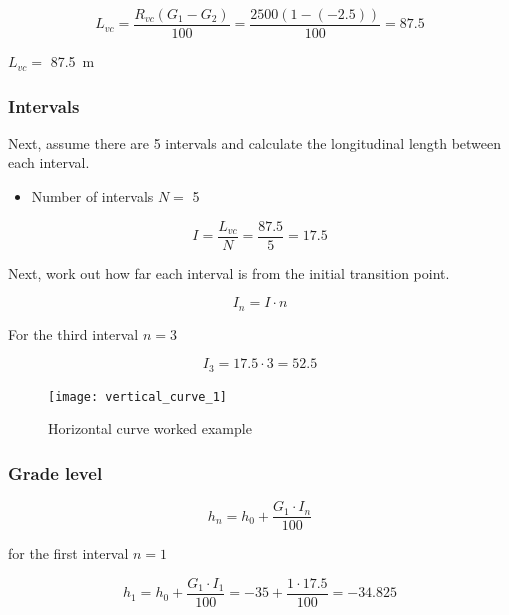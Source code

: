\documentclass{bcrre_exam}
\begin{document}
\begin{equation}
    L_{vc} = \frac{R_{vc}(G_1-G_2)}{100}=\frac{2500(1-(-2.5))}{100}=87.5
\end{equation}

$L_{vc}=$ \qty{87.5}{m}

\subsubsection*{Intervals}

Next, assume there are 5 intervals and calculate the longitudinal length between each interval.

\begin{itemize}
    \item Number of intervals $N=$ \num{5}
\end{itemize}

\begin{equation}
    I = \frac{L_{vc}}{N} = \frac{87.5}{5} = 17.5
\end{equation}

Next, work out how far each interval is from the initial transition point.

\begin{equation}
    I_n = I \cdot n
\end{equation}

For the third interval $n=3$

\begin{equation}
    I_3 = 17.5 \cdot 3 = 52.5
\end{equation}

\begin{figure}[h]
    \centering
    \texttt{[image: vertical\_curve\_1]}
    \caption{Horizontal curve worked example}
    \label{fig:hoz-cur-1}
\end{figure}

\subsubsection*{Grade level}

\begin{equation}
    h_n=h_0+\frac{G_1 \cdot I_n}{100}
\end{equation}

for the first interval $n=1$ 

\begin{equation}
    h_1=h_0+\frac{G_1 \cdot I_1}{100}=-35+\frac{1 \cdot 17.5}{100} = -34.825
\end{equation}
\end{document}

